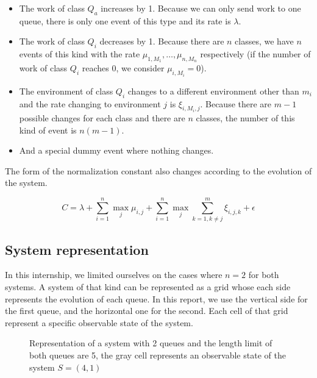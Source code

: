 \documentclass[
  a4paper, xcolor = usenames,dvipsnames]{article}
\providecommand{\tightlist}{%
  \setlength{\itemsep}{0pt}\setlength{\parskip}{0pt}}
\begin{document}
\begin{itemize}
\tightlist
\item
  The work of class \(Q_{a}\) increases by 1. Because we can only send work to one queue, there is only one event of this type and its rate is \(\lambda\).
\item
  The work of class \(Q_{i}\) decreases by 1. Because there are \(n\) classes, we have \(n\) events of this kind with the rate \(\mu_{1, M_{1}}, \dots, \mu_{n, M_{n}}\) respectively (if the number of work of class \(Q_{i}\) reaches 0, we consider \(\mu_{i, M_{i}} = 0\)).
\item
  The environment of class \(Q_{i}\) changes to a different environment other than \(m_{i}\) and the rate changing to environment \(j\) is \(\xi_{i, M_{i}, j}\). Because there are \(m - 1\) possible changes for each class and there are \(n\) classes, the number of this kind of event is \(n(m - 1)\).
\item
  And a special dummy event where nothing changes.
\end{itemize}

The form of the normalization constant also changes according to the evolution of the system.

\[
C = \lambda + \sum_{i = 1}^{n} \max_{j} \mu_{i, j} + \sum_{i = 1}^{n} \max_{j} \sum_{k = 1, k \neq j}^{m} \xi_{i, j, k} + \epsilon
\]

\hypertarget{system-representation}{%
\subsection{System representation}\label{system-representation}}

In this internship, we limited ourselves on the cases where \(n = 2\) for both systems. A system of that kind can be represented as a grid whose each side represents the evolution of each queue. In this report, we use the vertical side for the first queue, and the horizontal one for the second. Each cell of that grid represent a specific observable state of the system.

\begin{figure}
\centering
\def\mycolumns{5}
\def\myrows{5}
\caption[Representation of a system with 2 queues]{Representation of a system with 2 queues and the length limit of both queues are 5, the gray cell represents an observable state of the system $S = (4, 1)$}
\end{figure}
\end{document}
